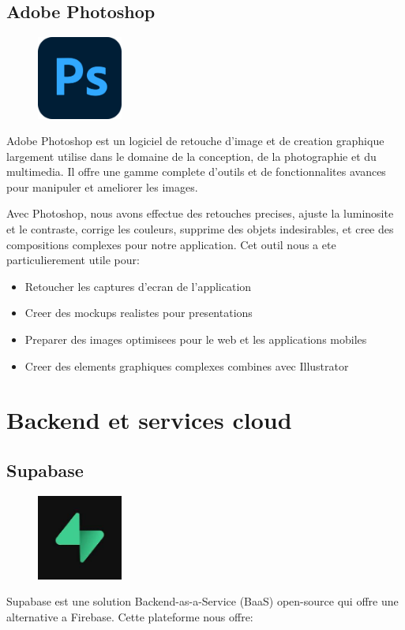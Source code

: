 \subsection{Adobe Photoshop}
\begin{figure}
    \centering
    \includegraphics[width=0.25\textwidth]{assets/docs/photoshop.png}
\end{figure}
Adobe Photoshop est un logiciel de retouche d'image et de creation graphique largement utilise dans le domaine de la conception, de la photographie et du multimedia. Il offre une gamme complete d'outils et de fonctionnalites avances pour manipuler et ameliorer les images.

Avec Photoshop, nous avons effectue des retouches precises, ajuste la luminosite et le contraste, corrige les couleurs, supprime des objets indesirables, et cree des compositions complexes pour notre application. Cet outil nous a ete particulierement utile pour:

\begin{itemize}
    \item Retoucher les captures d'ecran de l'application
    \item Creer des mockups realistes pour presentations
    \item Preparer des images optimisees pour le web et les applications mobiles
    \item Creer des elements graphiques complexes combines avec Illustrator
\end{itemize}

\section{Backend et services cloud}

\subsection{Supabase}
\begin{figure}
    \centering
    \includegraphics[width=0.25\textwidth]{assets/docs/logo_supabase.png}
\end{figure}
Supabase est une solution Backend-as-a-Service (BaaS) open-source qui offre une alternative a Firebase. Cette plateforme nous offre:

